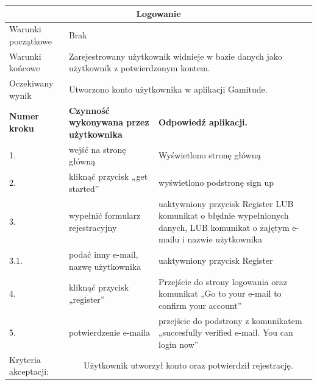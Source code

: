 \documentclass[a4paper,11pt]{report}
\begin{document}
\begin{table}[H]
	\centering
	\begin{tabular}{|p{2cm}|p{6cm}|p{6cm}|}
	\hline
	\multicolumn{3}{|c|}{\textbf{Logowanie}}\\
	\hline
	Warunki początkowe & \multicolumn{2}{|p{12cm}|}{Brak}\\
	\hline
	Warunki końcowe & \multicolumn{2}{|p{12cm}|}{Zarejestrowany użytkownik widnieje w bazie danych jako użytkownik z potwierdzonym kontem.}\\
	\hline
	Oczekiwany wynik & \multicolumn{2}{|p{12cm}|}{Utworzono konto użytkownika w aplikacji Gamitude.}\\
	\hline
	\textbf{Numer kroku} & \textbf{Czynność wykonywana przez użytkownika} & \textbf{Odpowiedź aplikacji.} \\
	\hline
	1. & wejść na stronę główną & Wyświetlono stronę główną \\
	\hline
	2. & kliknąć przycisk „get started” & wyświetlono podstronę sign up \\
	\hline
	3. & wypełnić formularz rejestracyjny & uaktywniony przycisk Register LUB komunikat o błędnie wypełnionych danych, LUB komunikat o zajętym e-mailu i nazwie użytkownika \\
	\hline
	3.1. & podać inny e-mail, nazwę użytkownika & uaktywniony przycisk Register \\
	\hline
	4. & kliknąć przycisk „register” & Przejście do strony logowania oraz komunikat „Go to your e-mail to confirm your account” \\
	\hline
	5. & potwierdzenie e-maila & przejście do podstrony z komunikatem „succesfully verified e-mail. You can login now” \\
	\hline
	Kryteria akceptacji: & \multicolumn{2}{|c|}{Użytkownik utworzył konto oraz potwierdził rejestrację.} \\
	\hline
	\end{tabular}
\end{table}
\end{document}
